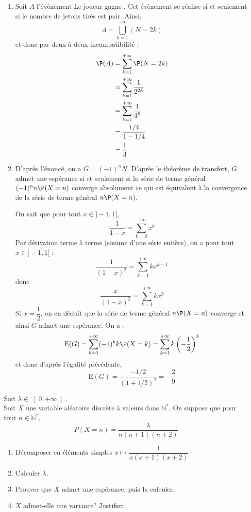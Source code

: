 \documentclass[a4paper,10pt]{report}
\begin{document}
\corr \begin{enumerate}
\item Soit $A$ l'évènement \og Le joueur gagne \fg . Cet évènement se réalise si et seulement si le nombre de jetons tirés est pair. Ainsi,
$$ A = \bigcup_{k=1}^{+ \infty} (N=2k) $$
et donc par deux à deux incompatibilité :
\begin{align*}
\P(A) & = \sum_{k=1}^{+ \infty} \P(N=2k) \\
& = \sum_{k=1}^{+ \infty} \dfrac{1}{2^{2k}} \\
& = \sum_{k=1}^{+ \infty} \dfrac{1}{4^k} \\
& = \dfrac{1/4}{1-1/4}  \\
& = \dfrac{1}{3} 
\end{align*}
\item D'après l'énoncé, on a $G=(-1)^n N$. D'après le théorème de transfert, $G$ admet une espérance si et seulement si la série de terme général $(-1)^n n \P(X=n)$ converge absolument ce qui est équivalent à la convergence de la série de terme général $n \P(X=n)$.

\medskip

\noindent  On sait que pour tout $x \in ]-1,1[$,
$$ \dfrac{1}{1-x} = \sum_{k=0}^{+ \infty} x^k$$
Par dérivation terme à terme (somme d'une série entière), on a pour tout $x \in ]-1,1[$ :
$$ \dfrac{1}{(1-x)^2} = \sum_{k=1}^{+ \infty} k x^{k-1}$$
donc 
$$ \dfrac{x}{(1-x)^2} = \sum_{k=1}^{+ \infty} kx^k$$
Si $x= \dfrac{1}{2}$, on en déduit que la série de terme général $n \P(X=n)$ converge et ainsi $G$ admet une espérance. On a :
$$ \textrm{E}(G) = \sum_{k=1}^{+ \infty} (-1)^k k \P(X=k) = \sum_{k=1}^{+ \infty} k \left( -\dfrac{1}{2} \right)^k$$
et donc d'après l'égalité précédente,
$$ \textrm{E}(G) = \dfrac{-1/2}{(1+1/2)^2} = - \dfrac{2}{9}$$
\end{enumerate}

\begin{Exa}Soit $\lambda \in{\left] 0,+\infty\right[ }$.\\
Soit $X$ une variable aléatoire discrète à valeurs dans $\mathbb{N}^\ast$. On suppose que pour tout $n \in \mathbb{N}^*$, 
$$P(X=n)=\dfrac{\lambda}{n(n+1)(n+2)} $$
\begin{enumerate}
\item Décomposer en éléments simples $x \mapsto \dfrac{1}{x(x+1)(x+2)} \cdot$
\item
Calculer $\lambda$.
\item
Prouver que $X$ admet une espérance, puis la calculer.
\item
$X$ admet-elle une variance? Justifier.
\end{enumerate}
\end{Exa}
\end{document}
